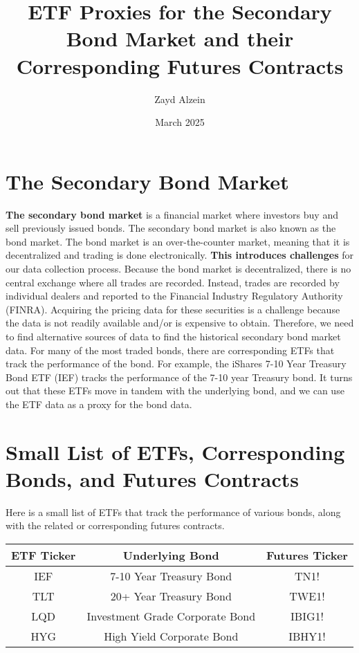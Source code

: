 \documentclass[12pt, letterpaper]{article}
\begin{document}
\title{ETF Proxies for the Secondary Bond Market and their Corresponding Futures Contracts}
\author{Zayd Alzein}
\date{March 2025}

\maketitle %

\section{The Secondary Bond Market}

\textbf{The secondary bond market} is a financial market where investors buy and sell previously issued bonds. 
The secondary bond market is also known as the bond market. The bond market is an over-the-counter market, 
meaning that it is decentralized and trading is done electronically. \textbf{This introduces challenges} for our data collection process.
Because the bond market is decentralized, there is no central exchange where all trades are recorded.
Instead, trades are recorded by individual dealers and reported to the Financial Industry Regulatory Authority (FINRA).
Acquiring the pricing data for these securities is a challenge because the data is not readily available and/or is expensive to obtain.
Therefore, we need to find alternative sources of data to find the historical secondary bond market data.
For many of the most traded bonds, there are corresponding ETFs that track the performance of the bond.
For example, the iShares 7-10 Year Treasury Bond ETF (IEF) tracks the performance of the 7-10 year Treasury bond.
It turns out that these ETFs move in tandem with the underlying bond, and we can use the ETF data as a proxy for the bond data.

\hspace{1cm}

\section{Small List of ETFs, Corresponding Bonds, and Futures Contracts}

Here is a small list of ETFs that track the performance of various bonds, along with the related or corresponding futures contracts.
\begin{table}[h!]
    \centering %
    \begin{tabular}{||c c c||}
        \hline
        ETF Ticker & Underlying Bond & Futures Ticker \\
        \hline
        IEF & 7-10 Year Treasury Bond & TN1! \\
        TLT & 20+ Year Treasury Bond & TWE1! \\
        LQD & Investment Grade Corporate Bond & IBIG1! \\
        HYG & High Yield Corporate Bond & IBHY1! \\
    \end{tabular}
    \label{table:1}

\end{table} %
\end{document}
